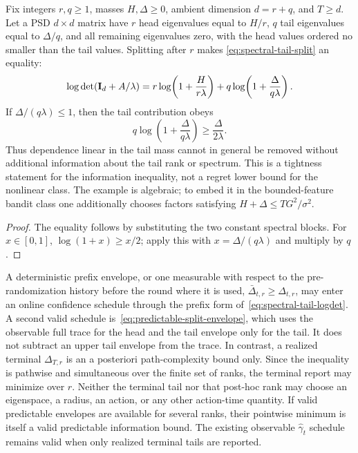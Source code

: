 \begin{proposition}
\label{prop:spectral-tail-tightness}
Fix integers $r,q\ge1$, masses $H,\Delta\ge0$, ambient dimension
$d=r+q$, and $T\ge d$.  Let a PSD
$d\times d$ matrix have $r$ head eigenvalues equal to $H/r$, $q$ tail eigenvalues equal to
$\Delta/q$, and all remaining eigenvalues zero, with the head values ordered
no smaller than the tail values.  Splitting after $r$ makes
\eqref{eq:spectral-tail-split} an equality:
\[
 \log\det(\mathbf{I}_d+A/\lambda)
 =r\log\!\left(1+\frac{H}{r\lambda}\right)
 +q\log\!\left(1+\frac{\Delta}{q\lambda}\right).
\]
If $\Delta/(q\lambda)\le1$, then the tail contribution obeys
\[
 q\log\!\left(1+\frac{\Delta}{q\lambda}\right)
 \ge\frac{\Delta}{2\lambda}.
\]
Thus dependence linear in the tail mass cannot in general be removed without
additional information about the tail rank or spectrum.  This is a tightness
statement for the information inequality, not a regret lower bound for the
nonlinear class.  The example is algebraic; to embed it in the bounded-feature
bandit class one additionally chooses factors satisfying
$H+\Delta\le TG^2/\sigma^2$.
\end{proposition}
\begin{proof}
The equality follows by substituting the two constant spectral blocks.  For
$x\in[0,1]$, $\log(1+x)\ge x/2$; apply this with
$x=\Delta/(q\lambda)$ and multiply by $q$.
\end{proof}

A deterministic prefix envelope, or one measurable with respect to the
pre-randomization history before the round where it is used,
$\bar\Delta_{t,r}\ge\Delta_{t,r}$, may enter an online confidence schedule
through the prefix form of~\eqref{eq:spectral-tail-logdet}.  A second valid
schedule is~\eqref{eq:predictable-split-envelope}, which uses the observable
full trace for the head and the tail envelope only for the tail.  It does not
subtract an upper tail envelope from the trace.  In contrast, a
realized terminal $\Delta_{T,r}$ is an a posteriori path-complexity bound only.
Since the inequality is pathwise and simultaneous over the finite set of ranks,
the terminal report may minimize over $r$.  Neither the terminal tail nor that
post-hoc rank may choose an eigenspace, a radius, an action, or any other
action-time quantity.  If valid predictable envelopes are available for several
ranks, their pointwise minimum is itself a valid predictable information bound.
The existing observable $\hat\gamma_t$ schedule remains valid when only realized
terminal tails are reported.

